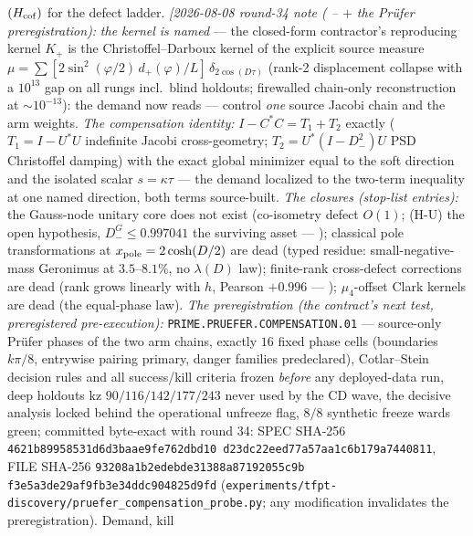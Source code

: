 \documentclass[11pt,a4paper]{article}
\begin{document}
{$(H_{\rm cof})$ for the defect ladder.
\emph{[2026-08-08 round-34 note
( --
 $+$ the Pr\"ufer
preregistration):} \emph{the kernel is named} --- the closed-form
contractor's reproducing kernel $K_+$ is the
Christoffel--Darboux kernel of the explicit source measure $\mu
= \sum [2\sin^2(\varphi/2)\,d_+(\varphi)/L]\,
\delta_{2\cos(D\tau)}$ (rank-2 displacement collapse with a
$10^{13}$ gap on all rungs incl.\ blind holdouts; firewalled
chain-only reconstruction at ${\sim}10^{-13}$): the demand now
reads --- control \emph{one} source Jacobi chain and the arm
weights.  \emph{The compensation identity:} $I - C^*C = T_1 +
T_2$ exactly ($T_1 = I - U^*U$ indefinite Jacobi cross-geometry;
$T_2 = U^*(I - D_-^2)U$ PSD Christoffel damping) with the exact
global minimizer equal to the soft direction and the isolated
scalar $s = \kappa\tau$ --- the demand localized to the two-term
inequality at one named direction, both terms source-built.
\emph{The closures (stop-list entries):} the Gauss-node unitary
core does not exist (co-isometry defect $O(1)$; (H-U) the open
hypothesis, $D_-^G \le 0.997041$ the surviving asset ---
); classical
pole transformations at $x_{\rm pole} = 2\cosh(D/2)$ are dead
(typed residue: small-negative-mass Geronimus at $3.5$--$8.1\%$,
no $\lambda(D)$ law); finite-rank cross-defect corrections are
dead (rank grows linearly with $h$, Pearson $+0.996$ ---
);
$\mu_4$-offset Clark kernels are dead (the equal-phase law).
\emph{The preregistration (the contract's next test,
preregistered pre-execution):}
\texttt{PRIME.PRUEFER.COMPENSATION.01} --- source-only Pr\"ufer
phases of the two arm chains, exactly $16$ fixed phase cells
(boundaries $k\pi/8$, entrywise pairing primary, danger families
predeclared), Cotlar--Stein decision rules and all success/kill
criteria frozen \emph{before} any deployed-data run, deep
holdouts kz $90/116/142/177/243$ never used by the CD wave, the
decisive analysis locked behind the operational unfreeze flag,
$8/8$ synthetic freeze wards green; committed byte-exact with
round 34: SPEC SHA-256
\texttt{4621b89958531d6d\allowbreak 3baae9fe762dbd10\allowbreak
d23dc22eed77a57a\allowbreak a1c6b179a7440811},
FILE SHA-256
\texttt{93208a1b2edebde3\allowbreak 1388a87192055c9b\allowbreak
f3e5a3de29af9fb3\allowbreak e34ddc904825d9fd}
(\texttt{experiments/\allowbreak tfpt-discovery/\allowbreak pruefer\_compensation\_probe.py};
any modification invalidates the preregistration).  Demand, kill
}
\end{document}

